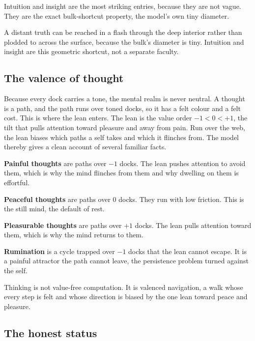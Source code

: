 Intuition and insight are the most striking entries, because they are not vague. They are the exact bulk-shortcut property, the model's own tiny diameter.

\begin{proposition}
A distant truth can be reached in a flash through the deep interior rather than plodded to across the surface, because the bulk's diameter is tiny. Intuition and insight are this geometric shortcut, not a separate faculty.
\end{proposition}

\subsection{The valence of thought}

Because every dock carries a tone, the mental realm is never neutral. A thought is a path, and the path runs over toned docks, so it has a felt colour and a felt cost. This is where the lean enters. The lean is the value order $-1 < 0 < +1$, the tilt that pulls attention toward pleasure and away from pain. Run over the web, the lean biases which paths a self takes and which it flinches from. The model thereby gives a clean account of several familiar facts.

\textbf{Painful thoughts} are paths over $-1$ docks. The lean pushes attention to avoid them, which is why the mind flinches from them and why dwelling on them is effortful.

\textbf{Peaceful thoughts} are paths over $0$ docks. They run with low friction. This is the still mind, the default of rest.

\textbf{Pleasurable thoughts} are paths over $+1$ docks. The lean pulls attention toward them, which is why the mind returns to them.

\textbf{Rumination} is a cycle trapped over $-1$ docks that the lean cannot escape. It is a painful attractor the path cannot leave, the persistence problem turned against the self.

\begin{principle}
Thinking is not value-free computation. It is valenced navigation, a walk whose every step is felt and whose direction is biased by the one lean toward peace and pleasure.
\end{principle}

\subsection{The honest status}

